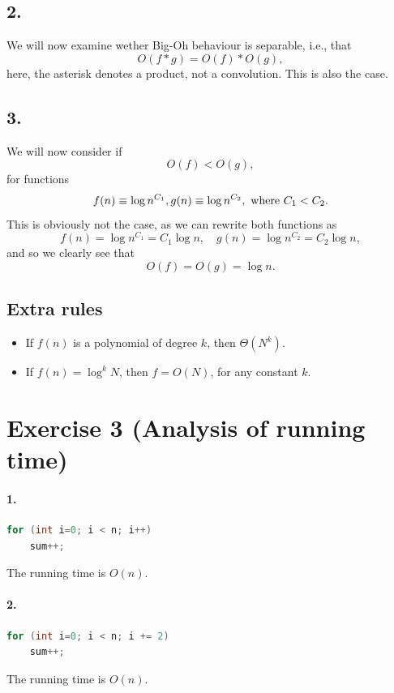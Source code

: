 \documentclass[a4paper, 11pt, notitlepage, english]{article}
\begin{document}
\subsection*{2.}
We will now examine wether Big-Oh behaviour is separable, i.e., that
$$O(f * g) = O(f) * O(g),$$
here, the asterisk denotes a product, not a convolution. This is also the case.

\subsection*{3.}
We will now consider if
$$O(f) < O(g),$$
for functions
$$f(n) \equiv \log n^{C_1}, g(n) \equiv \log n^{C_2}, \hbox{ where } C_1 < C_2.$$ 
This is obviously not the case, as we can rewrite both functions as
$$f(n) = \log n^{C_1} = C_1 \log n, \quad g(n) = \log n^{C_2} = C_2 \log n,$$
and so we clearly see that
$$O(f) = O(g) = \log n.$$

\subsection*{Extra rules}
\begin{itemize}
 \item If $f(n)$ is a polynomial of degree $k$, then $\Theta(N^k)$.
 \item If $f(n) = \log^k N$, then $f = O(N)$, for any constant $k$.
\end{itemize}


\clearpage

\section*{Exercise 3 (Analysis of running time)}

\paragraph{1.}
\begin{lstlisting}[language=java]
for (int i=0; i < n; i++)
    sum++;
\end{lstlisting}
The running time is $O(n)$.

\paragraph{2.}
\begin{lstlisting}[language=java]
for (int i=0; i < n; i += 2)
    sum++;
\end{lstlisting}
The running time is $O(n)$.
\end{document}
